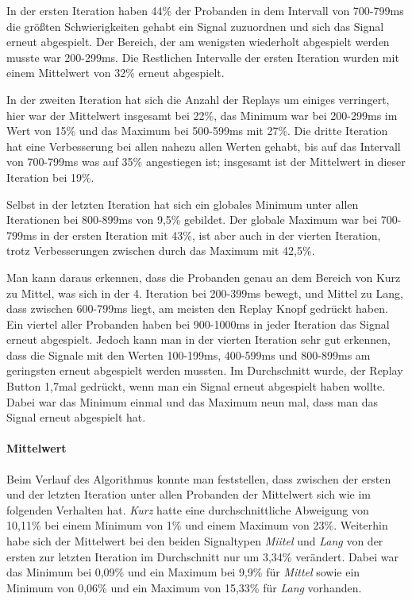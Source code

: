 In der ersten Iteration haben 44\% der Probanden in dem Intervall von 700-799ms die gr{\"o}{\ss}ten Schwierigkeiten gehabt ein Signal zuzuordnen und sich das Signal erneut abgespielt. 
Der Bereich, der am wenigsten wiederholt abgespielt werden musste war 200-299ms. 
Die Restlichen Intervalle der ersten Iteration wurden mit einem Mittelwert von 32\% erneut abgespielt.

In der zweiten Iteration hat sich die Anzahl der Replays um einiges verringert, hier war der Mittelwert insgesamt bei 22\%, das Minimum war bei 200-299ms im Wert von 15\% und das Maximum bei 500-599ms mit 27\%.  
Die dritte Iteration hat eine Verbesserung bei allen nahezu allen Werten gehabt, bis auf das Intervall von 700-799ms was auf 35\% angestiegen ist; insgesamt ist der Mittelwert in dieser Iteration bei 19\%. 

Selbst in der letzten Iteration hat sich ein globales Minimum unter allen Iterationen bei 800-899ms von 9,5\% gebildet. Der globale Maximum war bei 700-799ms in der ersten Iteration mit 43\%, ist aber auch in der vierten Iteration, trotz Verbesserungen zwischen durch das Maximum mit 42,5\%. 

Man kann daraus erkennen, dass die Probanden genau an dem Bereich von Kurz zu Mittel, was sich in der 4. Iteration bei 200-399ms bewegt, und Mittel zu Lang, dass zwischen 600-799ms liegt, am meisten den Replay Knopf gedr{\"u}ckt haben. 
Ein viertel aller Probanden haben bei 900-1000ms in jeder Iteration das Signal erneut abgespielt. 
Jedoch kann man in der vierten Iteration sehr gut erkennen, dass die Signale mit den Werten 100-199ms, 400-599ms und 800-899ms am geringsten erneut abgespielt werden mussten.
Im Durchschnitt wurde, der Replay Button 1,7mal gedr{\"u}ckt, wenn man ein Signal erneut abgespielt haben wollte. 
Dabei war das Minimum einmal und das Maximum neun mal, dass man das Signal erneut abgespielt hat.

\paragraph{Mittelwert}
Beim Verlauf des Algorithmus konnte man feststellen, dass zwischen der ersten und der letzten Iteration unter allen Probanden der Mittelwert sich wie im folgenden Verhalten hat. 
\textit{Kurz} hatte eine durchschnittliche Abweigung von 10,11\% bei einem Minimum von 1\% und einem Maximum von 23\%. 
Weiterhin habe sich der Mittelwert bei den beiden Signaltypen \textit{Miitel} und \textit{Lang} von der ersten zur letzten Iteration im Durchschnitt nur um 3,34\% ver{\"a}ndert.
Dabei war das Minimum bei 0,09\% und ein Maximum bei 9,9\% f{\"u}r \textit{Mittel} sowie ein Minimum von 0,06\% und ein Maximum von 15,33\% f{\"u}r \textit{Lang} vorhanden.


